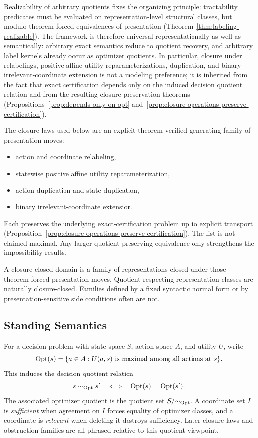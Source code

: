 Realizability of arbitrary quotients fixes the organizing principle: tractability predicates must be evaluated on representation-level structural classes, but modulo theorem-forced equivalences of presentation (Theorem~\ref{thm:labeling-realizable}). The framework is therefore universal representationally as well as semantically: arbitrary exact semantics reduce to quotient recovery, and arbitrary label kernels already occur as optimizer quotients. In particular, closure under relabelings, positive affine utility reparameterizations, duplication, and binary irrelevant-coordinate extension is not a modeling preference; it is inherited from the fact that exact certification depends only on the induced decision quotient relation and from the resulting closure-preservation theorems (Propositions~\ref{prop:depends-only-on-opt} and~\ref{prop:closure-operations-preserve-certification}).

The closure laws used below are an explicit theorem-verified generating family of presentation moves:
\begin{itemize}
\item action and coordinate relabeling,
\item statewise positive affine utility reparameterization,
\item action duplication and state duplication,
\item binary irrelevant-coordinate extension.
\end{itemize}
Each preserves the underlying exact-certification problem up to explicit transport (Proposition~\ref{prop:closure-operations-preserve-certification}). The list is not claimed maximal. Any larger quotient-preserving equivalence only strengthens the impossibility results.

A closure-closed domain is a family of representations closed under those theorem-forced presentation moves. Quotient-respecting representation classes are naturally closure-closed. Families defined by a fixed syntactic normal form or by presentation-sensitive side conditions often are not.

\subsection*{Standing Semantics}

For a decision problem with state space $S$, action space $A$, and utility $U$, write
\[
\operatorname{Opt}(s)=\{a\in A : U(a,s) \text{ is maximal among all actions at } s\}.
\]
This induces the decision quotient relation
\[
s \sim_{\operatorname{Opt}} s' \quad\Longleftrightarrow\quad \operatorname{Opt}(s)=\operatorname{Opt}(s').
\]
The associated optimizer quotient is the quotient set $S/{\sim_{\operatorname{Opt}}}$. A coordinate set $I$ is \emph{sufficient} when agreement on $I$ forces equality of optimizer classes, and a coordinate is \emph{relevant} when deleting it destroys sufficiency. Later closure laws and obstruction families are all phrased relative to this quotient viewpoint.

